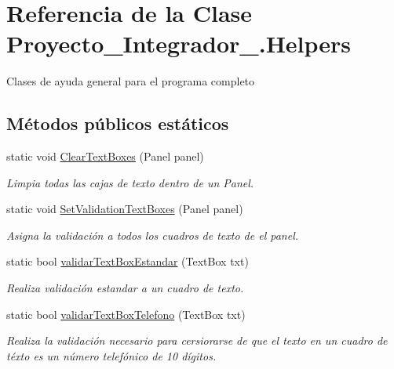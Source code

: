 \hypertarget{class_proyecto___integrador__3_1_1_helpers}{\section{Referencia de la Clase Proyecto\-\_\-\-Integrador\-\_.\-Helpers}
\label{class_proyecto___integrador__3_1_1_helpers}
}


Clases de ayuda general para el programa completo  


\subsection*{Métodos públicos estáticos}
\begin{DoxyCompactItemize}
\item 
static void \hyperlink{class_proyecto___integrador__3_1_1_helpers_ada922af713da8f3446fd27a8b3ac3494}{Clear\-Text\-Boxes} (Panel panel)
\begin{DoxyCompactList}\small\item\em Limpia todas las cajas de texto dentro de un Panel. \end{DoxyCompactList}\item 
static void \hyperlink{class_proyecto___integrador__3_1_1_helpers_aaede5d9d02c3e31c447e3e9abf113afa}{Set\-Validation\-Text\-Boxes} (Panel panel)
\begin{DoxyCompactList}\small\item\em Asigna la validación a todos los cuadros de texto de el panel. \end{DoxyCompactList}\item 
static bool \hyperlink{class_proyecto___integrador__3_1_1_helpers_ad5d8f36513117018c7ade0f2d6889222}{validar\-Text\-Box\-Estandar} (Text\-Box txt)
\begin{DoxyCompactList}\small\item\em Realiza validación estandar a un cuadro de texto. \end{DoxyCompactList}\item 
static bool \hyperlink{class_proyecto___integrador__3_1_1_helpers_ad9d7083d38ed1ad33bac8ef8e0dfea09}{validar\-Text\-Box\-Telefono} (Text\-Box txt)
\begin{DoxyCompactList}\small\item\em Realiza la validación necesario para cersiorarse de que el texto en un cuadro de téxto es un número telefónico de 10 dígitos. \end{DoxyCompactList}\item 

\end{DoxyCompactItemize}
